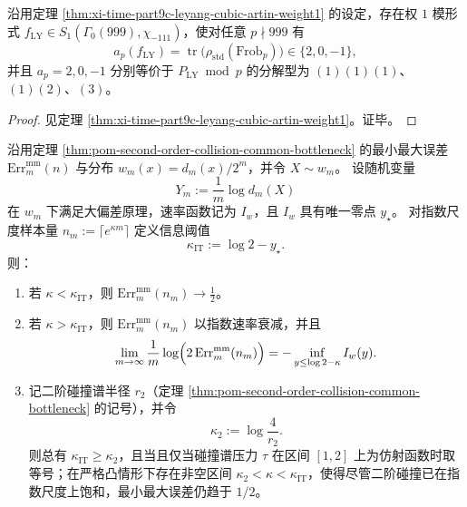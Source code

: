 \begin{corollary}\label{cor:conclusion-leyang-cubic-weight1-hecke-trace-encodes-splitting}
沿用定理 \ref{thm:xi-time-part9c-leyang-cubic-artin-weight1} 的设定，存在权 \(1\) 模形式 \(f_{\mathrm{LY}}\in S_1(\Gamma_0(999),\chi_{-111})\)，使对任意 \(p\nmid 999\) 有
\[
a_p(f_{\mathrm{LY}})=\operatorname{tr}\bigl(\rho_{\mathrm{std}}(\mathrm{Frob}_p)\bigr)\in\{2,0,-1\},
\]
并且 \(a_p=2,0,-1\) 分别等价于 \(P_{\mathrm{LY}}\bmod p\) 的分解型为 \((1)(1)(1)\)、\((1)(2)\)、\((3)\)。
\end{corollary}
\begin{proof}
见定理 \ref{thm:xi-time-part9c-leyang-cubic-artin-weight1}。证毕。
\end{proof}

\begin{theorem}[指数样本尺度下最小最大误差的多重分形尾质量律与阈值严格分离]\label{thm:conclusion-minimax-error-multifractal-tail-law}
沿用定理 \ref{thm:pom-second-order-collision-common-bottleneck} 的最小最大误差 \(\mathrm{Err}_m^{\mathrm{mm}}(n)\) 与分布 \(w_m(x)=d_m(x)/2^m\)，并令 \(X\sim w_m\)。
设随机变量
\[
Y_m:=\frac1m\log d_m(X)
\]
在 \(w_m\) 下满足大偏差原理，速率函数记为 \(I_w\)，且 \(I_w\) 具有唯一零点 \(y_\star\)。
对指数尺度样本量 \(n_m:=\lceil e^{\kappa m}\rceil\) 定义信息阈值
\[
\kappa_{\mathrm{IT}}:=\log 2-y_\star.
\]
则：
\begin{enumerate}
  \item 若 \(\kappa<\kappa_{\mathrm{IT}}\)，则 \(\mathrm{Err}_m^{\mathrm{mm}}(n_m)\to \tfrac12\)。
  \item 若 \(\kappa>\kappa_{\mathrm{IT}}\)，则 \(\mathrm{Err}_m^{\mathrm{mm}}(n_m)\) 以指数速率衰减，并且
  \[
  \lim_{m\to\infty}\frac1m\log\Bigl(2\,\mathrm{Err}_m^{\mathrm{mm}}(n_m)\Bigr)
  =
  -\inf_{y\le \log 2-\kappa} I_w(y).
  \]
  \item 记二阶碰撞谱半径 \(r_2\)（定理 \ref{thm:pom-second-order-collision-common-bottleneck} 的记号），并令
  \[
  \kappa_2:=\log\frac{4}{r_2}.
  \]
  则总有 \(\kappa_{\mathrm{IT}}\ge \kappa_2\)，且当且仅当碰撞谱压力 \(\tau\) 在区间 \([1,2]\) 上为仿射函数时取等号；在严格凸情形下存在非空区间 \(\kappa_2<\kappa<\kappa_{\mathrm{IT}}\)，使得尽管二阶碰撞已在指数尺度上饱和，最小最大误差仍趋于 \(1/2\)。
\end{enumerate}
\end{theorem}
